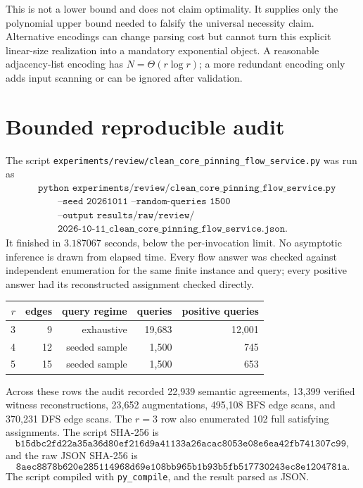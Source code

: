 \documentclass[11pt]{article}
\begin{document}
This is not a lower bound and does not claim optimality. It supplies only the
polynomial upper bound needed to falsify the universal necessity claim.
Alternative encodings can change parsing cost but cannot turn this explicit
linear-size realization into a mandatory exponential object. A reasonable
adjacency-list encoding has \(N=\Theta(r\log r)\); a more redundant encoding
only adds input scanning or can be ignored after validation.

\section{Bounded reproducible audit}

The script
\texttt{experiments/review/clean\_core\_pinning\_flow\_service.py} was run as
\[
\begin{split}
&\texttt{python experiments/review/clean\_core\_pinning\_flow\_service.py}\\
&\qquad\texttt{--seed 20261011 --random-queries 1500}\\
&\qquad\texttt{--output results/raw/review/}\\
&\qquad\texttt{2026-10-11\_clean\_core\_pinning\_flow\_service.json}.
\end{split}
\]
It finished in \(3.187067\) seconds, below the per-invocation limit. No
asymptotic inference is drawn from elapsed time. Every flow answer was checked
against independent enumeration for the same finite instance and query; every
positive answer had its reconstructed assignment checked directly.

\begin{center}
\begin{tabular}{rrrrr}
\toprule
\(r\) & edges & query regime & queries & positive queries\\
\midrule
3 & 9 & exhaustive & 19,683 & 12,001\\
4 & 12 & seeded sample & 1,500 & 745\\
5 & 15 & seeded sample & 1,500 & 653\\
\bottomrule
\end{tabular}
\end{center}

Across these rows the audit recorded 22,939 semantic agreements, 13,399
verified witness reconstructions, 23,652 augmentations, 495,108 BFS edge
scans, and 370,231 DFS edge scans. The \(r=3\) row also enumerated 102 full
satisfying assignments. The script SHA-256 is
\[
\texttt{b15dbc2fd22a35a36d80ef216d9a41133a26acac8053e08e6ea42fb741307c99},
\]
and the raw JSON SHA-256 is
\[
\texttt{8aec8878b620e285114968d69e108bb965b1b93b5fb517730243ec8e1204781a}.
\]
The script compiled with \texttt{py\_compile}, and the result parsed as JSON.
\end{document}
